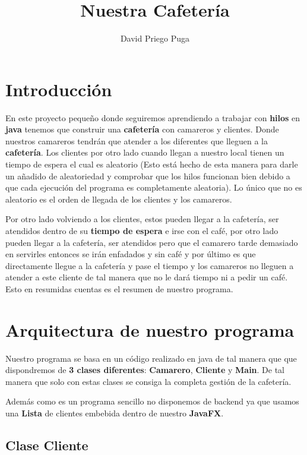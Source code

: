 \documentclass{article}
\title{Nuestra Cafetería}
\author{David Priego Puga}
\begin{document}
\maketitle


\section{Introducción}

En este proyecto pequeño donde seguiremos aprendiendo a trabajar con \textbf{hilos} en \textbf{java} tenemos que construir una \textbf{cafetería} con camareros y clientes. Donde nuestros camareros tendrán que atender a los diferentes que lleguen a la \textbf{cafetería}. Los clientes por otro lado cuando llegan a nuestro local tienen un tiempo de espera el cual es aleatorio (Esto está hecho de esta manera para darle un añadido de aleatoriedad y comprobar que los hilos funcionan bien debido a que cada ejecución del programa es completamente aleatoria). Lo único que no es aleatorio es el orden de llegada de los clientes y los camareros.

Por otro lado volviendo a los clientes, estos pueden llegar a la cafetería, ser atendidos dentro de su \textbf{tiempo de espera} e irse con el café, por otro lado pueden llegar a la cafetería, ser atendidos pero que el camarero tarde demasiado en servirles entonces se irán enfadados y sin café y por último es que directamente llegue a la cafetería y pase el tiempo y los camareros no lleguen a atender a este cliente de tal manera que no le dará tiempo ni a pedir un café. Esto en resumidas cuentas es el resumen de nuestro programa.

\section{Arquitectura de nuestro programa}

Nuestro programa se basa en un código realizado en java de tal manera que que dispondremos de \textbf{3 clases diferentes}: \textbf{Camarero}, \textbf{Cliente} y \textbf{Main}. De tal manera que solo con estas clases se consiga la completa gestión de la cafetería. 

Además como es un programa sencillo no disponemos de backend ya que usamos una \textbf{Lista} de clientes embebida dentro de nuestro \textbf{JavaFX}. 

\subsection{Clase Cliente}
\end{document}
